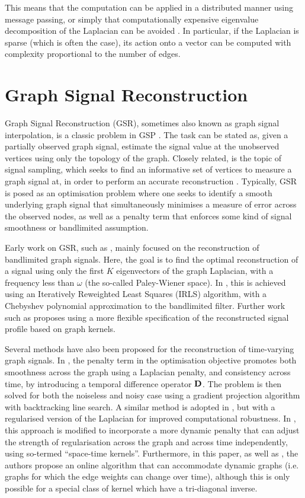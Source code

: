 This means that the computation can be applied in a distributed manner using message passing, or simply that computationally expensive eigenvalue decomposition of the Laplacian can be avoided \citep{Shuman2018}. In particular, if the Laplacian is sparse (which is often the case), its action onto a vector can be computed with complexity proportional to the number of edges. 


\section{Graph Signal Reconstruction}

Graph Signal Reconstruction (GSR), sometimes also known as graph signal interpolation, is a classic problem in GSP \citep{Ortega2018}. The task can be stated as, given a partially observed graph signal, estimate the signal value at the unobserved vertices using only the topology of the graph. Closely related, is the topic of signal sampling, which seeks to find an informative set of vertices to measure a graph signal at, in order to perform an accurate reconstruction \citep{Tanaka2020}. Typically, GSR is posed as an optimisation problem where one seeks to identify a smooth underlying graph signal that simultaneously minimises a measure of error across the observed nodes, as well as a penalty term that enforces some kind of signal smoothness or bandlimited assumption. 

Early work on GSR, such as \cite{Narang2013b,Narang2013,Wang2015b,Anis2016}, mainly focused on the reconstruction of bandlimited graph signals. Here, the goal is to find the optimal reconstruction of a signal using only the first $K$ eigenvectors of the graph Laplacian, with a frequency less than $\omega$ (the so-called Paley-Wiener space). In \cite{Narang2013b}, this is achieved using an Iteratively Reweighted Least Squares (IRLS) algorithm, with a Chebyshev polynomial approximation to the bandlimited filter. Further work such as \citep{Romero2017b} proposes using a more flexible specification of the reconstructed signal profile based on graph kernels. 

Several methods have also been proposed for the reconstruction of time-varying graph signals. In \cite{Qiu2017}, the penalty term in the optimisation objective promotes both smoothness across the graph using a Laplacian penalty, and consistency across time, by introducing a temporal difference operator $\mathbf{D}$. The problem is then solved for both the noiseless and noisy case using a gradient projection algorithm with backtracking line search. A similar method is adopted in \cite{Giraldo2022}, but with a regularised version of the Laplacian for improved computational robustness. In \cite{Ioannidis2016}, this approach is modified to incorporate a more dynamic penalty that can adjust the strength of regularisation across the graph and across time independently, using so-termed ``space-time kernels''. Furthermore, in this paper, as well as \cite{Romero2017,Ioannidis2018}, the authors propose an online algorithm that can accommodate dynamic graphs (i.e. graphs for which the edge weights can change over time), although this is only possible for a special class of kernel which have a tri-diagonal inverse. 

